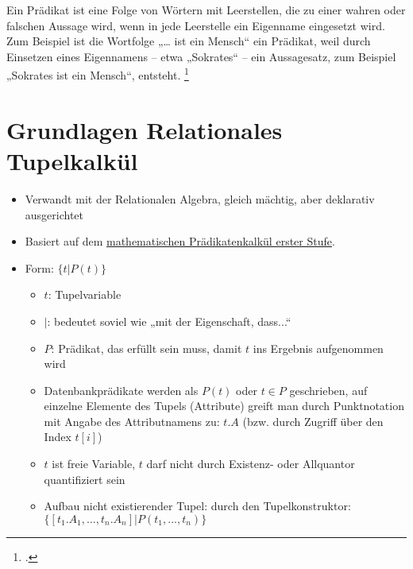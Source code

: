 \documentclass{lehramt-informatik-haupt}
\begin{document}
Ein Prädikat ist eine Folge von Wörtern mit Leerstellen, die zu einer
wahren oder falschen Aussage wird, wenn in jede Leerstelle ein Eigenname
eingesetzt wird. Zum Beispiel ist die Wortfolge „… ist ein Mensch“ ein
Prädikat, weil durch Einsetzen eines Eigennamens – etwa „Sokrates“ – ein
Aussagesatz, zum Beispiel „Sokrates ist ein Mensch“, entsteht.
\footcite{wiki:praedikatenlogik}

%

\section{Grundlagen Relationales Tupelkalkül}

\begin{itemize}
\item Verwandt mit der Relationalen Algebra, gleich mächtig, aber
deklarativ ausgerichtet

\item Basiert auf dem
\href{https://de.wikipedia.org/wiki/Pr%C3%A4dikatenlogik_erster_Stufe}
{mathematischen Prädikatenkalkül erster Stufe}.

\item Form: $\{t | P(t)\}$

\begin{itemize}
\item $t$: Tupelvariable

\item $|$: bedeutet soviel wie „mit der Eigenschaft, dass...“

\item $P$: Prädikat, das erfüllt sein muss, damit $t$ ins Ergebnis
aufgenommen wird

\item Datenbankprädikate werden als $P(t)$ oder $t \in P$ geschrieben,
auf einzelne Elemente des Tupels (Attribute) greift man durch
Punktnotation mit Angabe des Attributnamens zu: $t.A$ (bzw. durch
Zugriff über den Index $t[i]$)

\item $t$ ist freie Variable, \dh $t$ darf nicht durch Existenz- oder
Allquantor quantifiziert sein

\item Aufbau nicht existierender Tupel: durch den Tupelkonstruktor:
$\{[t_1.A_1,...,t_n.A_n] | P(t_1,...,t_n)\}$

\end{itemize}
\end{itemize}
\end{document}
